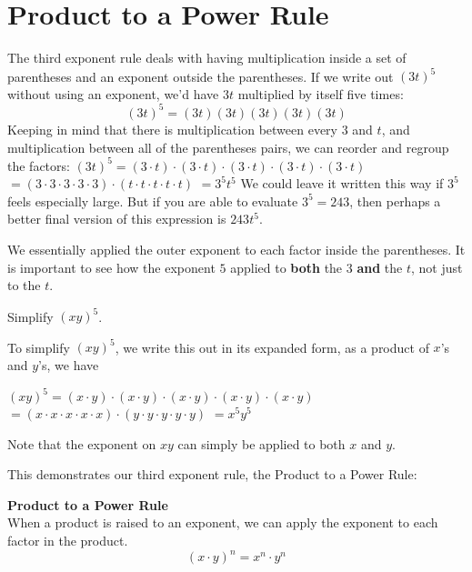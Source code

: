 \documentclass{ximera}
\begin{document}
      \section{Product to a Power Rule}
        The third exponent rule deals with having multiplication inside a set of parentheses and an exponent outside the parentheses.
        If we write out $\left(3t\right)^5$ without using an exponent,
        we'd have $3t$ multiplied by itself five times:
$$
      (3t)^5= (3t)(3t)(3t)(3t)(3t)
$$
        Keeping in mind that there is multiplication between every $3$ and $t$,
        and multiplication between all of the parentheses pairs,
        we can reorder and regroup the factors:
          $\left(3t\right)^5 = (3\cdot t)\cdot (3\cdot t)\cdot (3\cdot t)\cdot (3\cdot t)\cdot (3\cdot t)$
          $= \left(3\cdot 3\cdot 3\cdot 3\cdot 3 \right) \cdot \left(t \cdot t \cdot t \cdot t \cdot t\right)$
          $= 3^5 t^5$
        We could leave it written this way if $3^5$ feels especially large.
        But if you are able to evaluate $3^5=243$,
        then perhaps a better final version of this expression is $243t^5$.
 
        We essentially applied the outer exponent to each factor inside the parentheses.
        It is important to see how the exponent $5$ applied to \textbf{both} the $3$ \textbf{and} the $t$,
        not just to the $t$.
   

 \begin{example}   
          Simplify $(xy)^5$.
    
          To simplify $(xy)^5$,
          we write this out in its expanded form,
          as a product of $x$'s and $y$'s, we have

            $(xy)^5 =(x \cdot y) \cdot (x \cdot y) \cdot (x \cdot y) \cdot (x \cdot y) \cdot (x \cdot y)$
            $=(x \cdot x \cdot x \cdot x \cdot x) \cdot (y \cdot y \cdot y \cdot y \cdot y)$
            $=x^5 y^5$

          Note that the exponent on $xy$ can simply be applied to both $x$ and $y$.
\end{example}


      This demonstrates our third exponent rule,
      the Product to a Power Rule:
\begin{callout}
\textbf{ \Large Product to a Power Rule} \\
      When a product is raised to an exponent,
      we can apply the exponent to each factor in the product.
$$
        \left(x\cdot y\right)^n = x^{n}\cdot y^{n}
 $$
\end{callout}
\end{document}
